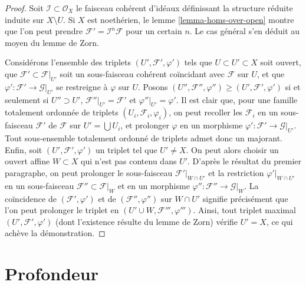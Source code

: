 \begin{proof}
Soit $\mathcal{I} \subset \mathcal{O}_X$ le faisceau cohérent d'idéaux
définissant la structure réduite induite sur $X \setminus U$.
Si $X$ est noethérien, le lemme \ref{lemma-homs-over-open} montre que
l'on peut prendre $\mathcal{F}' = \mathcal{I}^n\mathcal{F}$
pour un certain $n$. Le cas général s'en déduit au moyen du lemme de Zorn.

\medskip\noindent
Considérons l'ensemble des triplets $(U', \mathcal{F}', \varphi')$ tels que
$U \subset U' \subset X$ soit ouvert, que $\mathcal{F}' \subset \mathcal{F}|_{U'}$
soit un sous-faisceau cohérent coïncidant avec $\mathcal{F}$ sur $U$, et que
$\varphi' : \mathcal{F}' \to \mathcal{G}|_{U'}$ se restreigne à
$\varphi$ sur $U$. Posons
$(U'', \mathcal{F}'', \varphi'') \geq (U', \mathcal{F}', \varphi')$
si et seulement si $U'' \supset U'$, $\mathcal{F}''|_{U'} = \mathcal{F}'$
et $\varphi''|_{U'} = \varphi'$.
Il est clair que, pour une famille totalement ordonnée
de triplets $(U_i, \mathcal{F}_i, \varphi_i)$, on
peut recoller les $\mathcal{F}_i$ en un sous-faisceau $\mathcal{F}'$ de $\mathcal{F}$
sur $U' = \bigcup U_i$, et prolonger $\varphi$ en un morphisme
$\varphi' : \mathcal{F}' \to \mathcal{G}|_{U'}$.
Tout sous-ensemble totalement ordonné de triplets admet donc un
majorant. Enfin, soit $(U', \mathcal{F}', \varphi')$
un triplet tel que $U' \not = X$. On peut alors choisir un
ouvert affine $W \subset X$ qui n'est pas contenu dans $U'$.
D'après le résultat du premier paragraphe, on peut prolonger
le sous-faisceau $\mathcal{F}'|_{W \cap U'}$ et la restriction
$\varphi'|_{W \cap U'}$ en un sous-faisceau $\mathcal{F}'' \subset \mathcal{F}|_W$
et en un morphisme $\varphi'' : \mathcal{F}'' \to \mathcal{G}|_W$.
La coïncidence de $(\mathcal{F}', \varphi')$ et de
$(\mathcal{F}'', \varphi'')$ sur $W \cap U'$ signifie précisément que
l'on peut prolonger le triplet en $(U' \cup W, \mathcal{F}''', \varphi''')$.
Ainsi, tout triplet maximal $(U', \mathcal{F}', \varphi')$
(dont l'existence résulte du lemme de Zorn) vérifie $U' = X$, ce
qui achève la démonstration.
\end{proof}









\section{Profondeur}
\label{section-depth}

